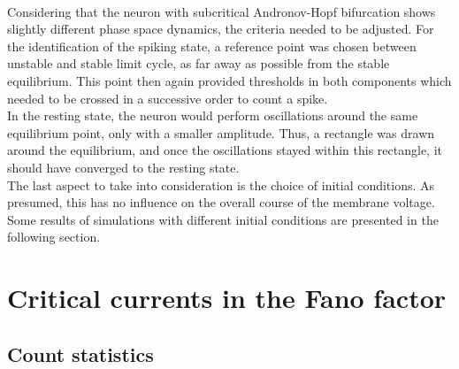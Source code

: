 \documentclass[12pt,a4paper]{article}
\begin{document}
\\
Considering that the neuron with subcritical Andronov-Hopf bifurcation shows slightly different phase space dynamics, the criteria needed to be adjusted. For the identification of the spiking state, a reference point was chosen between unstable and stable limit cycle, as far away as possible from the stable equilibrium. This point then again provided thresholds in both components which needed to be crossed in a successive order to count a spike. \\
In the resting state, the neuron would perform oscillations around the same equilibrium point, only with a smaller amplitude. Thus, a rectangle was drawn around the equilibrium, and once the oscillations stayed within this rectangle, it should have converged to the resting state. \\
The last aspect to take into consideration is the choice of initial conditions. As presumed, this has no influence on the overall course of the membrane voltage. Some results of simulations with different initial conditions are presented in the following section.
\section{Critical currents in the Fano factor}
\subsection{Count statistics}
\end{document}
